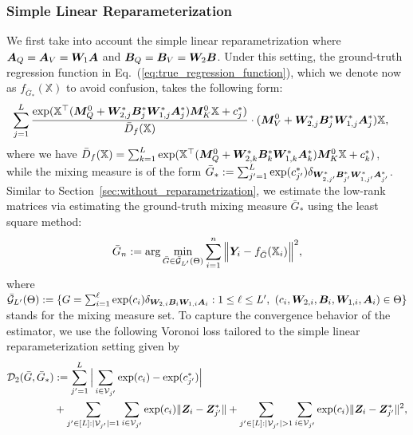 \subsubsection{Simple Linear Reparameterization}
We first take into account the simple linear reparametrization where ${\bm A}_Q={\bm A}_V=\bm{W}_{1}{\bm A}$ and ${\bm B}_Q={\bm B}_V=\bm{W}_{2}{\bm B}$. Under this setting, the ground-truth regression function in Eq.~(\ref{eq:true_regression_function}), which we denote now as $f_{\bar{G}_{*}}(\mathbb{X})$ to avoid confusion, takes the following form:
\begin{align}
 \hspace{-0.25 em}   & \sum_{j=1}^{L} \frac{\exp(\mathbb{X}^{\top} ({\bm M}^0_{Q}+\bm{W}_{2,j}^{*}{\bm B}_{j}^*\bm{W}_{1,j}^{*}{\bm A}_{j}^*){\bm M}^{0}_{K}\mathbb{X}+c^*_j)}{\bar{D}_{f}(\mathbb{X})} \cdot({\bm M}^0_{V}+\bm{W}_{2,j}^{*}{\bm B}_{j}^*
\bm{W}_{1,j}^{*}{\bm A}_{j}^*)\mathbb{X}, \label{eq:true_regression_function_linear}
\end{align}
where we have $\bar{D}_{f}(\mathbb{X}) = \sum_{k = 1}^{L}\exp(\mathbb{X}^{\top}({\bm M}^0_{Q}+\bm{W}_{2,k}^{*}{\bm B}_{k}^*\bm{W}_{1,k}^{*}{\bm A}_{k}^*){\bm M}^{0}_{K}\mathbb{X}+c^*_{k})$, while the mixing measure is of the form $\bar{G}_{*} := \sum_{j' = 1}^{L} \exp(c^*_{j'}) \delta_{\bm{W}_{2,j'}^{*}{\bm B}_{j'}^*
\bm{W}_{1,j'}^{*}{\bm A}_{j'}^*}$. Similar to Section~\ref{sec:without_reparametrization}, we estimate the low-rank matrices via estimating the ground-truth mixing measure $\bar{G}_*$ using the least square method:
\begin{align}
    \label{eq:least_squared_estimator_linear}
    \bar{G}_n:=\textnormal{arg} \min_{\bar{G}\in \bar{\mathcal{G}}_{L'}(\Theta)}\sum_{i=1}^{n}\Big\|{\bm Y}_i-f_{\bar{G}}(\mathbb{X}_i)\Big\|^2,
\end{align}
where $\bar{\mathcal{G}}_{L'}(\Theta):=\{G=\sum_{i=1}^{\ell}\exp(c_{i})\delta_{\bm{W}_{2,i}{\bm B}_{i}\bm{W}_{1,i}{\bm A}_{i}}:1\leq \ell\leq L', \  (c_{i},\bm{W}_{2,i},{\bm B}_{i}, \bm{W}_{1,i},{\bm A}_{i}) \in\Theta\}$ stands for the mixing measure set. To capture the convergence behavior of the estimator, we use the following Voronoi loss tailored to the simple linear reparameterization setting given by
\begin{align*}     
\mathcal{D}_2(\bar{G},\bar{G}_*)  &:=\sum_{j'=1}^{L}\Big|\sum_{i\in\mathcal{V}_{j'}}\exp(c_{i})-\exp(c_{j'}^{*})\Big| \\&+ {\sum_{j'\in[L]:|\mathcal{V}_{j'}|=1}\sum_{i\in\mathcal{V}_{j'}}\exp(c_{i}) \| \Zbm_i - \Zbm_{j'}^{*}\|}+\sum_{j'\in[L]:|\mathcal{V}_{j'}|>1}\sum_{i\in\mathcal{V}_{j'}}\exp(c_{i}) \| \Zbm_i - \Zbm_{j'}^{*}\|^2 ,
\end{align*}

